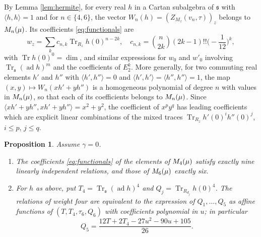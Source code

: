 \documentclass[leqno]{article}
\let\cal\relax
\newcommand{\cal}{\mathcal}
\renewcommand{\leq}{\ensuremath{\leqslant}}
\newtheorem{prop}[thm]{Proposition}
\numberwithin{equation}{section}
\begin{document}
By Lemma \ref{lem:hermite}, for every real $h$ in a Cartan subalgebra of $\mathfrak s$ with $\langle h,h\rangle = 1$ and for $n \in \{4,6\}$, the vector $W_n(h) = (Z_{M_z}(v_n,\tau))_z$ belongs to $\cal M_n(\mu)$. Its coefficients \eqref{eq:functionals} are
\begin{equation}
\label{eq:wn-coefficients}
w_z = \sum_{k}c_{n,k}\operatorname{Tr}_{R_z}h(0)^{n-2k},\quad c_{n,k} = \binom{n}{2k}(2k-1)!!\Big(-\frac{1}{12}\Big)^k,
\end{equation}
with $\operatorname{Tr}h(0)^0 = \dim$, and similar expressions for $w_0$ and $w'_0$ involving $\operatorname{Tr}_{\mathfrak s}(\operatorname{ad}h)^{m}$ and the coefficients of $E_2^k$. More generally, for two commuting real elements $h'$ and $h''$ with $\langle h',h''\rangle = 0$ and $\langle h',h'\rangle = \langle h'',h''\rangle = 1$, the map $(x,y) \mapsto W_n(xh'+yh'')$ is a homogeneous polynomial of degree $n$ with values in $\cal M_n(\mu)$, so that each of its coefficients belongs to $\cal M_n(\mu)$. Since $\langle xh'+yh'',xh'+yh''\rangle = x^2+y^2$, the coefficient of $x^py^q$ has leading coefficients which are explicit linear combinations of the mixed traces $\operatorname{Tr}_{R_z}h'(0)^ih''(0)^j$, $i \leq p$, $j \leq q$.

\begin{prop}
\label{prop:higher-relations}
Assume $\gamma = 0$.
\begin{enumerate}
\item The coefficients \eqref{eq:functionals} of the elements of $\cal M_4(\mu)$ satisfy exactly nine linearly independent relations, and those of $\cal M_6(\mu)$ exactly six.
\item For $h$ as above, put $T_4 = \operatorname{Tr}_{\mathfrak s}(\operatorname{ad}h)^4$ and $Q_j = \operatorname{Tr}_{R_{d_j}}h(0)^4$. The relations of weight four are equivalent to the expression of $Q_1,\ldots,Q_5$ as affine functions of $(T,T_4,\tau_6,Q_6)$ with coefficients polynomial in $u$; in particular
\begin{equation}
\label{eq:Q5}
Q_5 = \frac{12T+2T_4-27u^2-90u+105}{26}.
\end{equation}
\end{enumerate}
\end{prop}
\end{document}

